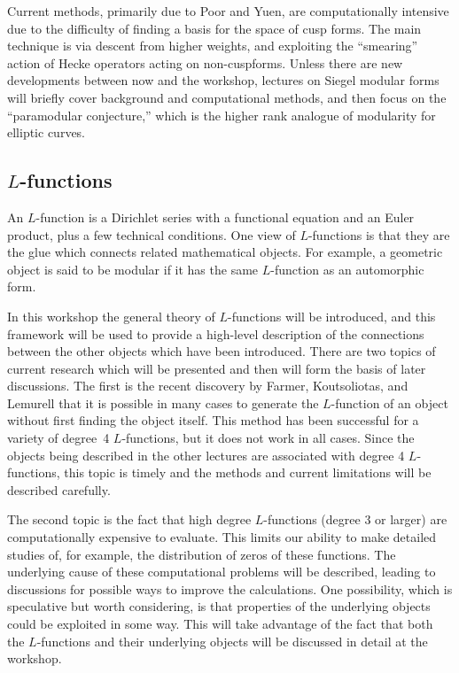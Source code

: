 \documentclass[amstex,11pt]{amsart}
\numberwithin{equation}{section}
\begin{document}
Current methods, primarily due to Poor and Yuen, are computationally
intensive due to the difficulty of finding a basis for the space of
cusp forms.  The main technique is via descent from higher weights,
and exploiting the ``smearing'' action of Hecke operators acting on
non-cuspforms.  Unless there are new developments between now and the
workshop, lectures on Siegel modular forms will briefly cover
background and computational methods, and then focus on the
``paramodular conjecture,'' which is the higher rank analogue of
modularity for elliptic curves.


\subsection{$L$-functions}

An $L$-function is a Dirichlet series with a functional equation and
an Euler product, plus a few technical conditions.  One view of
$L$-functions is that they are the glue which connects related
mathematical objects.  For example, a geometric object is said to be
modular if it has the same $L$-function as an automorphic form.

In this workshop the general theory of $L$-functions will be
introduced, and this framework will be used to provide a high-level
description of the connections between the other objects which have
been introduced.  There are two topics of current research which will
be presented and then will form the basis of later discussions.  The
first is the recent discovery by Farmer, Koutsoliotas, and Lemurell
that it is possible in many cases to generate the $L$-function of an
object without first finding the object itself.  This method has been
successful for a variety of degree~4 $L$-functions, but it does not
work in all cases.  Since the objects being described in the other
lectures are associated with degree 4 $L$-functions, this topic is
timely and the methods and current limitations will be described
carefully.

The second topic is the fact that high degree $L$-functions (degree 3
or larger) are computationally expensive to evaluate.  This limits our
ability to make detailed studies of, for example, the distribution of
zeros of these functions.  The underlying cause of these computational
problems will be described, leading to discussions for possible ways
to improve the calculations.  One possibility, which is speculative
but worth considering, is that properties of the underlying objects
could be exploited in some way.  This will take advantage of the fact
that both the $L$-functions and their underlying objects will be
discussed in detail at the workshop.
\end{document}
